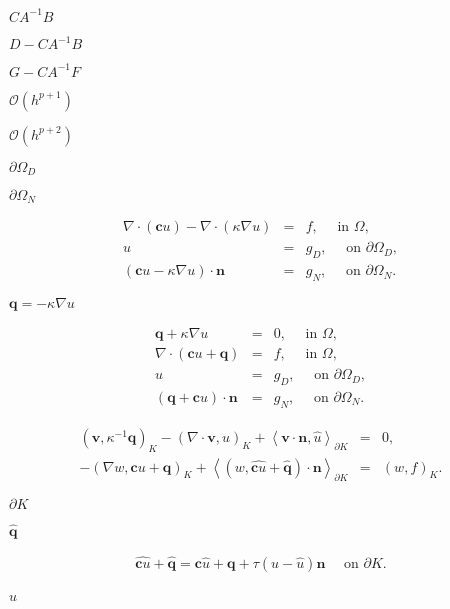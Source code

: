 \documentclass{article}
\begin{document}
$CA^{-1}B$
\pagebreak

$D-C A^{-1} B$
\pagebreak

$G - C A^{-1} F$
\pagebreak

$\mathcal{O}(h^{p+1})$
\pagebreak

$\mathcal{O}(h^{p+2})$
\pagebreak

$\partial \Omega_D$
\pagebreak

$\partial \Omega_N$
\pagebreak

\begin{eqnarray*} \nabla \cdot (\mathbf{c} u) - \nabla \cdot (\kappa \nabla u) &=& f, \quad \text{ in } \Omega, \\ u &=& g_D, \quad \text{ on } \partial \Omega_D, \\ (\mathbf{c} u - \kappa \nabla u)\cdot \mathbf{n} &=& g_N, \quad \text{ on } \partial \Omega_N. \end{eqnarray*}
\pagebreak

$\mathbf{q}=-\kappa \nabla u$
\pagebreak

\begin{eqnarray*} \mathbf{q} + \kappa \nabla u &=& 0, \quad \text{ in } \Omega, \\ \nabla \cdot (\mathbf{c} u + \mathbf{q}) &=& f, \quad \text{ in } \Omega, \\ u &=& g_D, \quad \text{ on } \partial \Omega_D, \\ (\mathbf{q} + \mathbf{c}u)\cdot\mathbf{n} &=& g_N, \quad \text{ on } \partial \Omega_N. \end{eqnarray*}
\pagebreak

\begin{eqnarray*} (\mathbf{v}, \kappa^{-1} \mathbf{q})_K - (\nabla\cdot\mathbf{v}, u)_K + \left<\mathbf{v}\cdot\mathbf{n}, \hat{u}\right>_{\partial K} &=& 0, \\ - (\nabla w, \mathbf{c} u + \mathbf{q})_K + \left<(w, \widehat{\mathbf{c} u}+\hat{\mathbf{q}})\cdot\mathbf{n}\right>_{\partial K} &=& (w,f)_K. \end{eqnarray*}
\pagebreak

$\partial K$
\pagebreak

$\hat{\mathbf{q}}$
\pagebreak

\begin{eqnarray*} \widehat{\mathbf{c} u}+\hat{\mathbf{q}} = \mathbf{c}\hat{u} + \mathbf{q} + \tau(u - \hat{u})\mathbf{n} \quad \text{ on } \partial K. \end{eqnarray*}
\pagebreak

$\hat {u}$
\pagebreak
\end{document}
